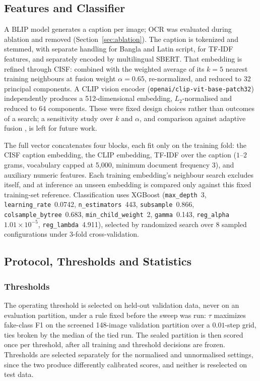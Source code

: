 \documentclass[journal]{IEEEtran}
\begin{document}
\subsection{Features and Classifier}
\label{sec:features}

A BLIP model generates a caption per image; OCR was evaluated during ablation
and removed (Section~\ref{sec:ablation}). The caption is tokenized and stemmed,
with separate handling for Bangla and Latin script, for TF-IDF features, and
separately encoded by multilingual SBERT. That embedding is refined through
CISF: combined with the weighted average of its $k=5$ nearest training
neighbours at fusion weight $\alpha=0.65$, re-normalized, and reduced to 32
principal components. A CLIP vision encoder
(\texttt{openai/clip-vit-base-patch32}) independently produces a
512-dimensional embedding, $L_2$-normalised and reduced to 64 components. These
were fixed design choices rather than outcomes of a search; a sensitivity study
over $k$ and $\alpha$, and comparison against adaptive fusion
\cite{mmfusionnet,claaf}, is left for future work.

The full vector concatenates four blocks, each fit only on the training fold:
the CISF caption embedding, the CLIP embedding, TF-IDF over the caption
($1$--$2$ grams, vocabulary capped at 5{,}000, minimum document frequency 3),
and auxiliary numeric features. Each training embedding's neighbour search
excludes itself, and at inference an unseen embedding is compared only against
this fixed training-set reference. Classification uses XGBoost
(\texttt{max\_depth}~3, \texttt{learning\_rate}~0.0742,
\texttt{n\_estimators}~443, \texttt{subsample}~0.866,
\texttt{colsample\_bytree}~0.683, \texttt{min\_child\_weight}~2,
\texttt{gamma}~0.143, \texttt{reg\_alpha}~$1.01\times10^{-5}$,
\texttt{reg\_lambda}~4.911), selected by randomized search over 8 sampled
configurations under 3-fold cross-validation.

\subsection{Protocol, Thresholds and Statistics}
\label{sec:training}

\subsubsection{Thresholds}
The operating threshold is selected on held-out validation data, never on an
evaluation partition, under a rule fixed before the sweep was run: $\tau$
maximizes fake-class F1 on the screened 148-image validation partition over a
$0.01$-step grid, ties broken by the median of the tied run. The sealed
partition is then scored once per threshold, after all training and threshold
decisions are frozen. Thresholds are selected separately for the normalised and
unnormalised settings, since the two produce differently calibrated scores, and
neither is reselected on test data.
\end{document}
